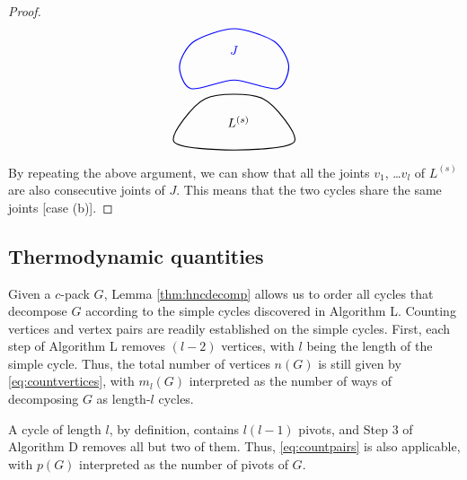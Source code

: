 \documentclass[notitlepage,preprint]{revtex4-1}
\begin{document}
\begin{proof}
\[\begin{tikzpicture}
    \draw[black, thick] plot [smooth cycle]
      coordinates{ ( 0.8*\sz, 0.6*\sz)
                   ( 3.0*\sz, 3.6*\sz)
                   ( 7.0*\sz, 3.6*\sz)
                   ( 9.2*\sz, 0.6*\sz)
                   ( 5.0*\sz, 0.0*\sz) };

    \node (L) at (5.3*\sz, 2.0*\sz) {$L^{(s)}$};
    
    \draw[blue, thick] plot [smooth cycle]
      coordinates{
                   ( 2.0*\sz, 4.3*\sz)
                   ( 1.2*\sz, 5.9*\sz)
                   ( 2.2*\sz, 7.6*\sz)
                   ( 5.0*\sz, 8.5*\sz)
                   ( 7.8*\sz, 7.6*\sz)
                   ( 8.8*\sz, 5.9*\sz)
                   ( 8.0*\sz, 4.3*\sz)
                   ( 5.0*\sz, 4.9*\sz) };


    \node (J) at (5.0*\sz, 7.0*\sz) [blue] {$J$};
  \end{tikzpicture}
\]

By repeating the above argument, we can show that
  all the joints $v_1$, \dots $v_l$ of $L^{(s)}$
  are also consecutive joints of $J$.
%
This means that the two cycles share the same joints
  [case (b)].
\end{proof}




\subsection*{Thermodynamic quantities}


Given a $c$-pack $G$,
  Lemma \ref{thm:hncdecomp} allows us
  to order all cycles that decompose $G$
  according to the simple cycles
  discovered in Algorithm L.
%
Counting vertices and vertex pairs
  are readily established on the simple cycles.
%
First, each step of Algorithm L removes $(l - 2)$ vertices,
  with $l$ being the length of the simple cycle.
%
Thus, the total number of vertices $n(G)$
  is still given by \eqref{eq:countvertices},
  with $m_l(G)$ interpreted as
  the number of ways
  of decomposing $G$ as length-$l$ cycles.

A cycle of length $l$, by definition,
  contains $l (l - 1)$ pivots,
  and Step 3 of Algorithm D
  removes all but two of them.
%
Thus, \eqref{eq:countpairs}
  is also applicable, with $p(G)$ interpreted
  as the number of pivots of $G$.
\end{document}
